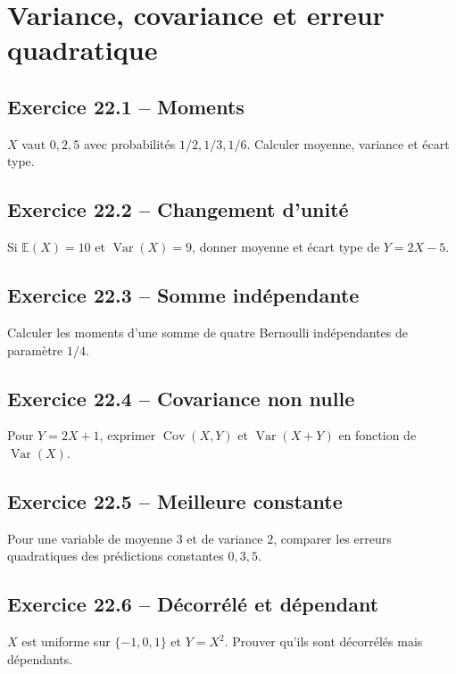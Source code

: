 \chapter{Variance, covariance et erreur quadratique}
\section*{Exercice 22.1 -- Moments}
$X$ vaut $0,2,5$ avec probabilités $1/2,1/3,1/6$. Calculer moyenne, variance et écart type.

\section*{Exercice 22.2 -- Changement d'unité}
Si $\mathbb E(X)=10$ et $\operatorname{Var}(X)=9$, donner moyenne et écart type de $Y=2X-5$.

\section*{Exercice 22.3 -- Somme indépendante}
Calculer les moments d'une somme de quatre Bernoulli indépendantes de paramètre $1/4$.

\section*{Exercice 22.4 -- Covariance non nulle}
Pour $Y=2X+1$, exprimer $\operatorname{Cov}(X,Y)$ et $\operatorname{Var}(X+Y)$ en fonction de $\operatorname{Var}(X)$.

\section*{Exercice 22.5 -- Meilleure constante}
Pour une variable de moyenne $3$ et de variance $2$, comparer les erreurs quadratiques des prédictions constantes $0,3,5$.

\section*{Exercice 22.6 -- Décorrélé et dépendant}
$X$ est uniforme sur $\{-1,0,1\}$ et $Y=X^2$. Prouver qu'ils sont décorrélés mais dépendants.
